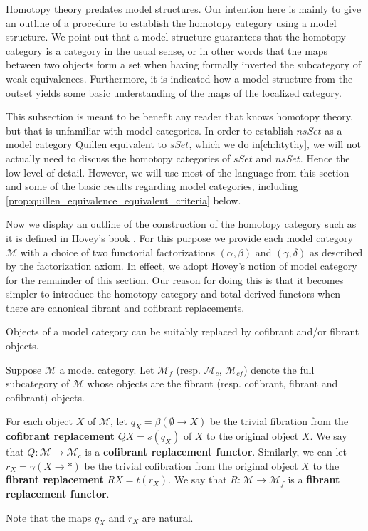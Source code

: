 Homotopy theory predates model structures. Our intention here is mainly to give an outline of a procedure to establish the homotopy category using a model structure. We point out that a model structure guarantees that the homotopy category is a category in the usual sense, or in other words that the maps between two objects form a set when having formally inverted the subcategory of weak equivalences. Furthermore, it is indicated how a model structure from the outset yields some basic understanding of the maps of the localized category.

This subsection is meant to be benefit any reader that knows homotopy theory, but that is unfamiliar with model categories. In order to establish $nsSet$ as a model category Quillen equivalent to $sSet$, which we do in\cref{ch:htythy}, we will not actually need to discuss the homotopy categories of $sSet$ and $nsSet$. Hence the low level of detail. However, we will use most of the language from this section and some of the basic results regarding model categories, including \cref{prop:quillen_equivalence_equivalent_criteria} below.

Now we display an outline of the construction of the homotopy category such as it is defined in Hovey's book \cite[Sec.~1.2, pp.~7--13]{Ho99}. For this purpose we provide each model category $\mathscr{M}$ with a choice of two functorial factorizations $(\alpha ,\beta )$ and $(\gamma ,\delta )$ as described by the factorization axiom. In effect, we adopt Hovey's notion of model category \cite[Def.~1.1.4]{Ho99} for the remainder of this section. Our reason for doing this is that it becomes simpler to introduce the homotopy category and total derived functors when there are canonical fibrant and cofibrant replacements.

Objects of a model category can be suitably replaced by cofibrant and/or fibrant objects.
\begin{definition}\label{def:categories_of_cofibrant_fibrant_objects}
Suppose $\mathscr{M}$ a model category. Let $\mathscr{M} _f$ (resp. $\mathscr{M} _c$, $\mathscr{M} _{cf}$) denote the full subcategory of $\mathscr{M}$ whose objects are the fibrant (resp. cofibrant, fibrant and cofibrant) objects.

For each object $X$ of $\mathscr{M}$, let $q_X=\beta (\emptyset \to X)$ be the trivial fibration from the \textbf{cofibrant replacement} $QX=s(q_X)$ of $X$ to the original object $X$. We say that $Q:\mathscr{M} \to \mathscr{M} _c$ is a \textbf{cofibrant replacement functor}. Similarly, we can let $r_X=\gamma (X\to *)$ be the trivial cofibration from the original object $X$ to the \textbf{fibrant replacement} $RX=t(r_X)$. We say that $R:\mathscr{M} \to \mathscr{M} _f$ is a \textbf{fibrant replacement functor}.
\end{definition}
\noindent Note that the maps $q_X$ and $r_X$ are natural.

